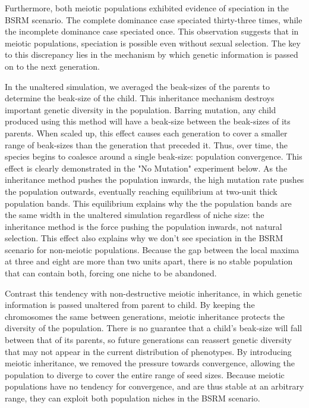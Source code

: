 \documentclass[conference]{IEEEtran}
\begin{document}
Furthermore, both meiotic populations exhibited evidence of speciation in the BSRM scenario. The complete dominance case speciated thirty-three times, while the incomplete dominance case speciated once. This observation suggests that in meiotic populations, speciation is possible even without sexual selection. The key to this discrepancy lies in the mechanism by which genetic information is passed on to the next generation. 

In the unaltered simulation, we averaged the beak-sizes of the parents to determine the beak-size of the child. This inheritance mechanism destroys important genetic diversity in the population. Barring mutation, any child produced using this method will have a beak-size between the beak-sizes of its parents. When scaled up, this effect causes each generation to cover a smaller range of beak-sizes than the generation that preceded it. Thus, over time, the species begins to coalesce around a single beak-size: population convergence. This effect is clearly demonstrated in the "No Mutation" experiment below. As the inheritance method pushes the population inwards, the high mutation rate pushes the population outwards, eventually reaching equilibrium at two-unit thick population bands. This equilibrium explains why the the population bands are the same width in the unaltered simulation regardless of niche size: the inheritance method is the force pushing the population inwards, not natural selection. This effect also explains why we don’t see speciation in the BSRM scenario for non-meiotic populations. Because the gap between the local maxima at three and eight are more than two units apart, there is no stable population that can contain both, forcing one niche to be abandoned.

Contrast this tendency with non-destructive meiotic inheritance, in which genetic information is passed unaltered from parent to child. By keeping the chromosomes the same between generations, meiotic inheritance protects the diversity of the population. There is no guarantee that a child’s beak-size will fall between that of its parents, so future generations can reassert genetic diversity that may not appear in the current distribution of phenotypes. By introducing meiotic inheritance, we removed the pressure towards convergence, allowing the population to diverge to cover the entire range of seed sizes. Because meiotic populations have no tendency for convergence, and are thus stable at an arbitrary range, they can exploit both population niches in the BSRM scenario.
\end{document}
